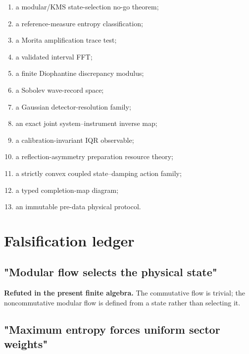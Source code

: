 \documentclass[11pt,a4paper,openany]{report}
\begin{document}
\begin{enumerate}
\item 
a modular/\allowbreak{}KMS state-selection no-go theorem;

\item 
a reference-measure entropy classification;

\item 
a Morita amplification trace test;

\item 
a validated interval FFT;

\item 
a finite Diophantine discrepancy modulus;

\item 
a Sobolev wave-record space;

\item 
a Gaussian detector-resolution family;

\item 
an exact joint system--instrument inverse map;

\item 
a calibration-invariant IQR observable;

\item 
a reflection-asymmetry preparation resource theory;

\item 
a strictly convex coupled state--damping action family;

\item 
a typed completion-map diagram;

\item 
an immutable pre-data physical protocol.

\end{enumerate}

\section{Falsification ledger}

\subsection{"Modular flow selects the physical state"}

\textbf{Refuted in the present finite algebra.} The commutative flow is trivial; the noncommutative modular flow is defined from a state rather than selecting it.

\subsection{"Maximum entropy forces uniform sector weights"}
\end{document}
